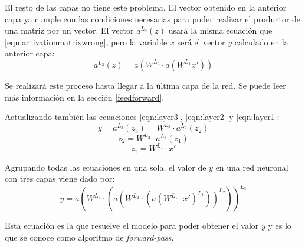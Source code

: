 El resto de las capas no tiene este problema. El vector obtenido en la anterior capa ya cumple con las condiciones necesarias para poder realizar el productor de una matriz por un vector. El vector $a^{L_2}(z)$ usará la misma ecuación que \ref{eqn:activationmatrixwrong}, pero la variable $x$ será el vector $y$ calculado en la anterior capa:
\begin{equation}
  a^{L_2}(z) = a(W^{L_2} \cdot a(W^{L_1}x'))
\end{equation}

Se realizará este proceso hasta llegar a la última capa de la red. Se puede leer más información en la sección \ref{feedforward}.
\newline


Actualizando también las ecuaciones \ref{eqn:layer3}, \ref{eqn:layer2} y \ref{eqn:layer1}:
\begin{equation}
    y = a^{L_3}(z_3) = W^{L_3} \cdot a^{L_2}(z_2) 
\end{equation}
\begin{equation}
    z_2 = W^{L_2} \cdot a^{L_1}(z_1)
\end{equation}
\begin{equation}
    z_1 = W^{L_1} \cdot x'
\end{equation}

Agrupando todas las ecuaciones en una sola, el valor de $y$ en una red neuronal con tres capas viene dado por:
\begin{equation}
    y = a(W^{L_3} \cdot (a(W^{L_2} \cdot (a(W^{L_1} \cdot x')^{L_1}))^{L_2}))^{L_3}
    \label{eqn:feedforwardexample}
\end{equation}

Esta ecuación es la que resuelve el modelo para poder obtener el valor $y$ y es lo que se conoce como algoritmo de \textit{forward-pass}.
\newline